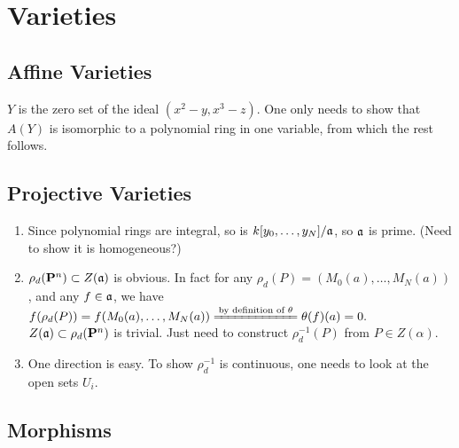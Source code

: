 \documentclass{note}
\newcommand{\Proj}[1]{\mathbf{P}^{#1}}
\begin{document}
\chapter{Varieties}

\section{Affine Varieties}

\setcounter{exercise}{1}
\Ex
$Y$ is the zero set of the ideal $(x^2-y,x^3-z)$. One only needs to
show that $A(Y)$ is isomorphic to a polynomial ring in one variable, from which
the rest follows.

\section{Projective Varieties}

\setcounter{exercise}{11}
\Ex
\begin{enumerate}
  \item Since polynomial rings are integral, so is
        $k[y_0,\dots,y_N]/\mathfrak{a}$, so $\mathfrak{a}$ is prime. (Need to show
        it is homogeneous?)
  \item $\rho_d(\Proj{n})\subset Z(\ideal{a})$ is obvious. In
        fact for any $\rho_d(P)=(M_0(a),\dots,M_N(a))$, and any $f\in\mathfrak{a}$, we
        have $f(\rho_d(P)) = f(M_0(a),\dots,M_N(a)) \xlongequal{\text{by definition of
            }\theta}
          \theta(f)(a) = 0.$\\ $Z(\ideal{a})\subset\rho_d(\Proj{n})$ is trivial.
        Just need to construct $\rho_d^{-1}(P)$ from $P\in Z(\alpha)$.
  \item One
        direction is easy. To show $\rho_d^{-1}$ is continuous, one needs to look at
        the open sets $U_i$.
\end{enumerate}

\section{Morphisms}

\end{document}

